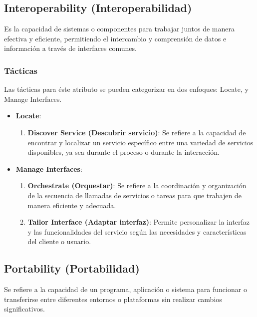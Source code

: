 \documentclass{article}
\begin{document}
		
		\subsection{Interoperability  \small{(Interoperabilidad)}}
		Es la capacidad de sistemas o componentes para trabajar juntos de manera efectiva y eficiente, permitiendo el intercambio y comprensión de datos e información a través de interfaces comunes.
		
		
		\subsubsection{Tácticas}
		Las tácticas para éste atributo se pueden categorizar en dos enfoques: Locate, y Manage Interfaces. 
		
		\begin{itemize}		
			\item \textbf{Locate}:
			\begin{enumerate}
				\item \textbf{Discover Service (Descubrir servicio)}: Se refiere a la capacidad de encontrar y localizar un servicio específico entre una variedad de servicios disponibles, ya sea durante el proceso o durante la interacción.
				
			\end{enumerate}
			
			\item \textbf{Manage Interfaces}:
			\begin{enumerate}
				\item \textbf{Orchestrate (Orquestar)}: Se refiere a la coordinación y organización de la secuencia de llamadas de servicios o tareas para que trabajen de manera eficiente y adecuada.
				
				
				
				\item \textbf{Tailor Interface (Adaptar interfaz)}: Permite personalizar la interfaz y las funcionalidades del servicio según las necesidades y características del cliente o usuario.

				
			\end{enumerate}	
			
		\end{itemize}
		
		\subsection{Portability  \small{(Portabilidad)}}
		Se refiere a la capacidad de un programa, aplicación o sistema para funcionar o transferirse entre diferentes entornos o plataformas sin realizar cambios significativos.
		
\end{document}

